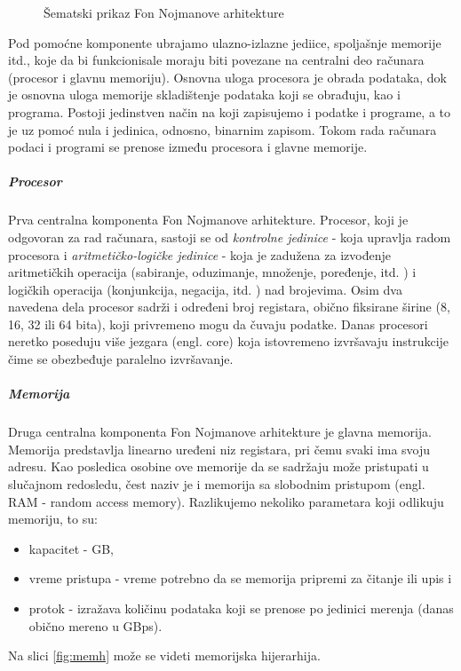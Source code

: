 \documentclass[a4paper]{article}
\begin{document}
{\begin{figure}[h!]
\begin{center}
\end{center}
\caption{Šematski prikaz Fon Nojmanove arhitekture}
\label{fig:fonN}
\end{figure}
Pod pomoćne komponente ubrajamo ulazno-izlazne jediice, spoljašnje memorije itd., koje da bi funkcionisale moraju biti povezane na centralni deo računara (procesor i glavnu memoriju).
Osnovna uloga procesora je obrada podataka, dok je osnovna uloga memorije skladištenje podataka koji se obrađuju, kao i programa. Postoji jedinstven način na koji zapisujemo i podatke i programe, a to je uz pomoć nula i jedinica, odnosno, binarnim zapisom. Tokom rada računara podaci i programi se prenose između procesora i glavne memorije.
\subparagraph{Procesor} Prva centralna komponenta Fon Nojmanove arhitekture. Procesor, koji je odgovoran za rad računara, sastoji se od \textit{kontrolne jedinice} - koja upravlja radom procesora i \textit{aritmetičko-logičke jedinice} - koja je zadužena za izvođenje aritmetičkih operacija (sabiranje, oduzimanje, množenje, poređenje, itd. ) i logičkih operacija (konjunkcija, negacija, itd. ) nad brojevima. Osim dva navedena dela procesor sadrži i određeni broj registara, obično fiksirane širine (8, 16, 32 ili 64 bita), koji privremeno mogu da čuvaju podatke. Danas procesori neretko poseduju više jezgara (engl. core) koja istovremeno izvršavaju instrukcije čime se obezbeđuje paralelno izvršavanje.
\subparagraph{Memorija} Druga centralna komponenta Fon Nojmanove arhitekture
je glavna memorija. Memorija predstavlja linearno uređeni niz registara, pri čemu svaki ima svoju adresu. Kao posledica osobine ove memorije da se sadržaju može pristupati u slučajnom redosledu, čest naziv je i memorija sa slobodnim pristupom (engl. RAM - random access memory). Razlikujemo nekoliko parametara koji odlikuju memoriju, to su:
\begin{itemize}
\item kapacitet - GB,
\item vreme pristupa - vreme potrebno da se memorija pripremi za čitanje ili upis i 
\item protok - izražava količinu podataka koji se prenose po jedinici merenja (danas obično mereno u GBps).
\end{itemize}
Na slici \ref{fig:memh} može se videti memorijska hijerarhija.
\begin{figure}[h!]
\begin{center}

\end{center}
\end{figure}}
\end{document}
